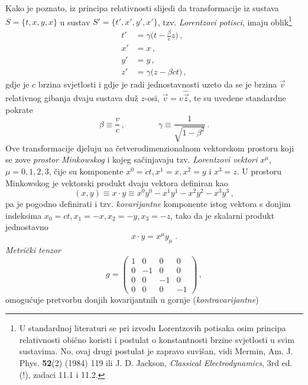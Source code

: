 Kako je poznato, iz principa relativnosti slijedi da
transformacije iz sustava $S=\{t,x,y,x\}$ u sustav $S'=\{t',x',y',x'\}$, 
tzv. \emph{Lorentzovi potisci}, imaju oblik\footnote{U
standardnoj literaturi se pri izvodu Lorentzovih potisaka osim principa
relativnosti obično koristi i postulat o konstantnosti brzine svjetlosti
u svim sustavima.  No, ovaj drugi postulat je zapravo suvišan, vidi
Mermin, Am. J. Phys. \textbf{52}(2) (1984) 119 ili J. D. Jackson,
\emph{Classical Electrodynamics}, 3rd ed.(!), zadaci 11.1 i 11.2.}
\begin{align}
t' &= \gamma \big(t-\frac{\beta}{c}z\big) \,, \\
x' &= x \,, \\
y' &= y \,,  \\
z' &= \gamma \big(z-\beta ct \big) \,,
\end{align}
gdje je $c$ brzina svjetlosti i
gdje je radi jednostavnosti uzeto da se je brzina $\vec{v}$ relativnog gibanja
dvaju sustava duž $z$-osi, $\vec{v}=v\hat{\vec{z}}$, te su uvedene standardne pokrate
\begin{displaymath}
 \beta \equiv \frac{v}{c} \,, \qquad \qquad \gamma\equiv\frac{1}{
\sqrt{1-\beta^2}} \,.
\end{displaymath}
Ove transformacije djeluju na četverodimenzionalnom vektorskom prostoru koji
se zove \emph{prostor Minkowskog} i kojeg sačinjavaju tzv.
\emph{Lorentzovi vektori}
$x^\mu$,  $\mu=0,1,2,3$, čije su komponente  $x^0=ct, x^1=x, x^2=y$ i $x^3=z$.
U prostoru Minkowskog je vektorski produkt dvaju vektora definiran kao
\begin{equation}
    (x, y) \equiv x \cdot y \equiv x^0 y^0 - x^1 y^1 - x^2 y^2 - x^3 y^3 \,,
    \label{eq:produktminkowskog}
\end{equation}
pa je  pogodno definirati i tzv. \emph{kovarijantne}
komponente istog vektora s donjim indeksima
$x_0=ct, x_1=-x, x_2=-y, x_3=-z$, tako da je skalarni produkt jednostavno
\begin{equation}
x \cdot y = x^{\mu} y_{\mu} \;.
\end{equation}
\emph{Metrički tenzor}
\begin{equation}
g = 
\begin{pmatrix}
1 & 0 & 0 & 0 \\
0 &-1 & 0 & 0 \\
0 & 0 &-1 & 0 \\
0 & 0 & 0 &-1
\end{pmatrix} \,,
    \label{eq:metrickitenzor}
\end{equation}
omogućuje pretvorbu donjih kovarijantnih u gornje (\emph{kontravarijantne})
